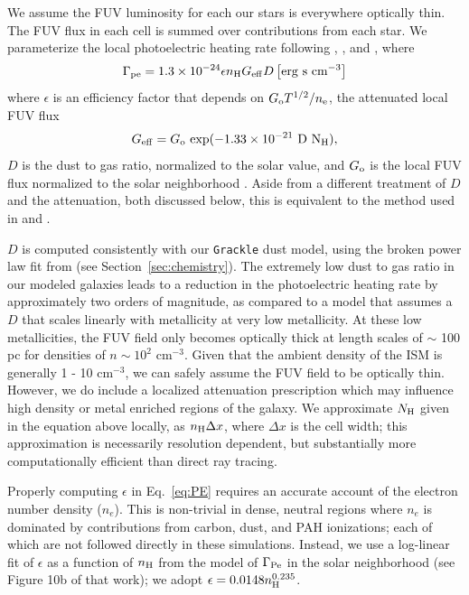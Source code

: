 \documentclass[twocolumn]{aastex61}
\newcommand{\ccunit}{cm$^{-3}$}
\begin{document}
We assume the FUV luminosity for each our stars is everywhere optically thin. The FUV flux in each cell is summed over contributions from each star. We parameterize the local photoelectric heating rate following \citet{BakesTielens1994}, \citet{Wolfire2003}, and \citet{Bergin2004}, where 
\begin{equation}
\label{eq:PE}
\Gamma_{\rm pe} = 1.3 \times 10^{-24} \epsilon n_{\rm H} G_{\rm eff} D \left[{\rm erg~s~cm^{-3}}\right]
\end{equation}
where $\epsilon$ is an efficiency factor that depends on $G_{\rm{o}} T^{1/2} /n_{\rm{e}}$, the attenuated local FUV flux \begin{equation} G_{\rm eff} = G_{\rm o}~\rm{exp}(-1.33\times10^{-21}~D~N_{\rm H}), \end{equation} $D$ is the dust to gas ratio, normalized to the solar value, and $G_{\rm o}$ is the local FUV flux normalized to the solar neighborhood \citep{Habing1968}. Aside from a different treatment of $D$ and the attenuation, both discussed below, this is equivalent to the method used in \citet{Hu2016} and \citet{Hu2017}.

$D$ is computed consistently with our \texttt{Grackle} dust model, using the broken power law fit from \citet{Remy-Ruyer2014} (see Section~\ref{sec:chemistry}). The extremely low dust to gas ratio in our modeled galaxies leads to a reduction in the photoelectric heating rate by approximately two orders of magnitude, as compared to a model that assumes a $D$ that scales linearly with metallicity at very low metallicity. At these low metallicities, the FUV field only becomes optically thick at length scales of $\sim$ 100 pc for densities of $n \sim 10^2$ \ccunit. Given that the ambient density of the ISM is generally 1 - 10 cm$^{-3}$, we can safely assume the FUV field to be optically thin. However, we do include a localized attenuation prescription which may influence high density or metal enriched regions of the galaxy. We approximate $N_{\rm H}$ given in the equation above locally, as $n_{\rm H}\Delta x$, where $\Delta x$ is the cell width; this approximation is necessarily resolution dependent, but substantially more computationally efficient than direct ray tracing.

Properly computing $\epsilon$ in Eq.~\ref{eq:PE} requires an accurate account of the electron number density ($n_e$). This is non-trivial in dense, neutral regions where $n_e$ is dominated by contributions from carbon, dust, and PAH ionizations; each of which are not followed directly in these simulations. Instead, we use a log-linear fit of $\epsilon$ as a function of $n_{\rm H}$ from the \citet{Wolfire2003} model of $\Gamma_{\rm{Pe}}$ in the solar neighborhood (see Figure 10b of that work); we adopt $\epsilon = 0.0148n_{\rm{H}}^{0.235}$. %
\end{document}
